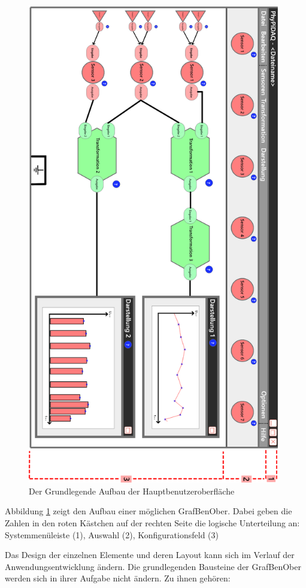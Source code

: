 \documentclass[parskip=full]{scrartcl}
\begin{document}
\begin{figure}[htbp]
	\begin{center}
		\includegraphics[width = 11cm]{Grafik/Konkreter-Anwendungsfall}
		\caption{Der Grundlegende Aufbau der Hauptbenutzeroberfläche}
		\label{GUI_Grundlage}
	\end{center}
\end{figure}

Abbildung \ref{GUI_Grundlage} zeigt den Aufbau einer möglichen \gls{GrafBenOber}. Dabei geben die Zahlen in den roten Kästchen auf der rechten Seite die logische Unterteilung an: Systemmenüleiste (1), Auswahl (2), Konfigurationsfeld (3)

Das Design der einzelnen Elemente und deren Layout kann sich im Verlauf der Anwendungsentwicklung ändern. Die grundlegenden Bausteine der \gls{GrafBenOber} werden sich in ihrer Aufgabe nicht ändern. Zu ihnen gehören:
\end{document}
